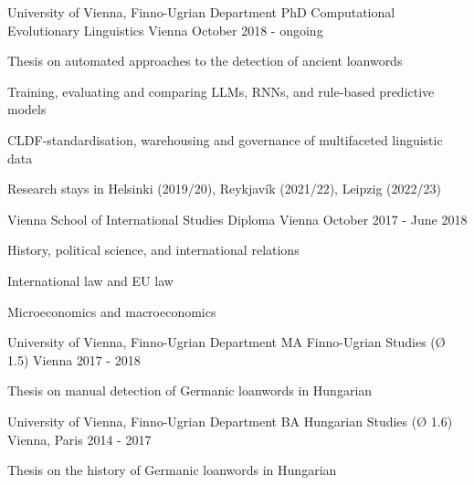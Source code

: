 

\begin{cventries}

  \cventry
    {University of Vienna, Finno-Ugrian Department} %
    {PhD Computational Evolutionary Linguistics} %
    {Vienna} %
    {October 2018 - ongoing} %
    {
      \begin{cvitems} %
        \item{Thesis on automated approaches to the detection of ancient loanwords}
        \item{Training, evaluating and comparing LLMs, RNNs, and rule-based predictive models}
        \item{CLDF-standardisation, warehousing and governance of multifaceted linguistic data}
        \item{Research stays in Helsinki (2019/20), Reykjavík (2021/22), Leipzig (2022/23)}
      \end{cvitems}
    }

  \cventry
    {Vienna School of International Studies} %
    {Diploma} %
    {Vienna} %
    {October 2017 - June 2018} %
    {
    \begin{cvitems} %
        \item{History, political science, and international relations}
        \item{International law and EU law}
        \item{Microeconomics and macroeconomics}
      \end{cvitems}
    }

  \cventry
    {University of Vienna, Finno-Ugrian Department} %
    {MA Finno-Ugrian Studies (Ø 1.5)} %
    {Vienna} %
    {2017 - 2018} %
    {
      \begin{cvitems} %
        \item {Thesis on manual detection of Germanic loanwords in Hungarian}
      \end{cvitems}
    }

  \cventry
    {University of Vienna, Finno-Ugrian Department} %
    {BA Hungarian Studies (Ø 1.6)} %
    {Vienna, Paris} %
    {2014 - 2017} %
    {
      \begin{cvitems} %
        \item {Thesis on the history of Germanic loanwords in Hungarian}
      \end{cvitems}
    }
        

\end{cventries}

